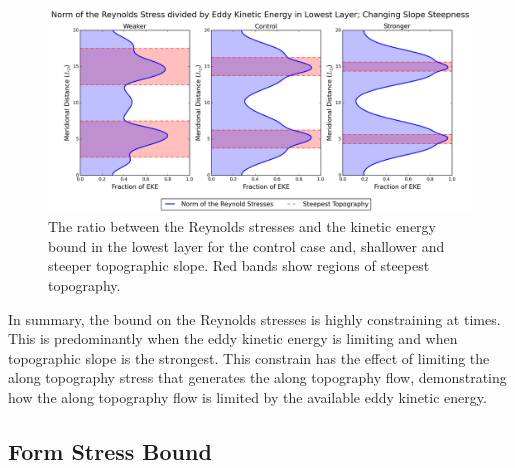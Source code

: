 \documentclass[12pt,a4paper]{report}
\begin{document}
\begin{figure}
	\centering
	\includegraphics[width=\linewidth]{normovereke_2_1}
	\caption{The ratio between the Reynolds stresses and the kinetic energy bound in
		the lowest layer for the control case and, shallower and steeper topographic slope. Red bands show regions of steepest topography. }
	\label{fig:normoverekewidth}
\end{figure}

In summary, the bound on the Reynolds stresses is highly constraining at times.
This is predominantly when the eddy kinetic energy is limiting and when topographic
slope is the strongest. This constrain has the effect of limiting the along 
topography stress that generates the along topography flow, demonstrating how
the along topography flow is limited by the available eddy kinetic energy.


\subsection{Form Stress Bound}
\end{document}
